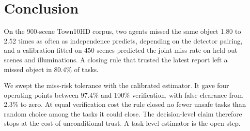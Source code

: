 \section{Conclusion}

On the 900-scene Town10HD corpus, two agents missed the same object 1.80 to
2.52 times as often as independence predicts, depending on the detector
pairing, and a calibration fitted on 450 scenes predicted the joint miss rate
on held-out scenes and illuminations. A closing rule that trusted the latest
report left a missed object in 80.4\% of tasks.

We swept the miss-risk tolerance with the calibrated estimator. It gave four
operating points between 97.4\% and 100\% verification, with false clearance
from 2.3\% to zero. At equal verification cost the rule closed no fewer unsafe
tasks than random choice among the tasks it could close. The decision-level
claim therefore stops at the cost of unconditional trust. A task-level
estimator is the open step.
